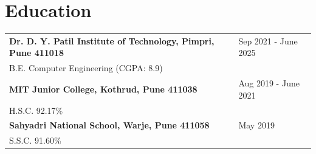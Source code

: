 \documentclass[a4paper,10pt]{article}
\makeatletter
\newenvironment{jobshort}[2]
    {
    \begin{tabularx}{\linewidth}{@{}l X r@{}}
    \textbf{#1} & \hfill &  #2 \\[3.75pt]
    \end{tabularx}
    }
    {
    }
\newenvironment{joblong}[2]
    {
    \begin{tabularx}{\linewidth}{@{}l X r@{}}
    \textbf{#1} & \hfill &  #2 \\[3.75pt]
    \end{tabularx}
    \begin{minipage}[t]{\linewidth}
    \begin{itemize}[nosep,after=\strut, leftmargin=1em, itemsep=3pt,label=--]
    }
    {
    \end{itemize}
    \end{minipage}    
    }
\makeatother
\begin{document}

\section{Education}
\begin{tabularx}{\linewidth}{@{}l X@{}}	

\textbf{Dr. D. Y. Patil Institute of Technology, Pimpri, Pune 411018} & \hfill 
Sep 2021 - June 2025 \\ \vspace*{2mm} 
B.E. Computer Engineering (CGPA: 8.9)\\ 

\textbf{MIT Junior College, Kothrud, Pune 411038} & \hfill 
Aug 2019 - June 2021 \\ \vspace*{2mm}
H.S.C. 92.17\% \\ 

\textbf{Sahyadri National School, Warje, Pune 411058} & \hfill 
May 2019 \\ 
S.S.C. 91.60\% \\

\end{tabularx}




\end{document}
